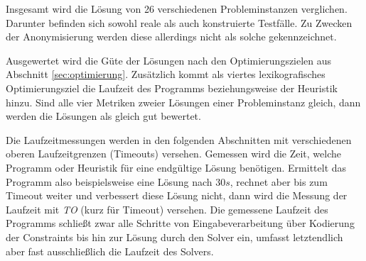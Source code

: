 Insgesamt wird die Lösung von 26 verschiedenen Probleminstanzen verglichen.
Darunter befinden sich sowohl reale als auch konstruierte Testfälle.
Zu Zwecken der Anonymisierung werden diese allerdings nicht als solche gekennzeichnet.

Ausgewertet wird die Güte der Lösungen nach den Optimierungszielen aus Abschnitt \ref{sec:optimierung}.
Zusätzlich kommt als viertes lexikografisches Optimierungsziel die Laufzeit des Programms beziehungsweise der Heuristik hinzu.
Sind alle vier Metriken zweier Lösungen einer Probleminstanz gleich, dann werden die Lösungen als gleich gut bewertet.

Die Laufzeitmessungen werden in den folgenden Abschnitten mit verschiedenen oberen Laufzeitgrenzen (Timeouts) versehen.
Gemessen wird die Zeit, welche Programm oder Heuristik für eine endgültige Lösung benötigen.
Ermittelt das Programm also beispielsweise eine Lösung nach $30s$, rechnet aber bis zum Timeout weiter und verbessert diese Lösung nicht,
dann wird die Messung der Laufzeit mit \textit{\gls{TO}} (kurz für Timeout) versehen.
Die gemessene Laufzeit des Programms schließt zwar alle Schritte von Eingabeverarbeitung über Kodierung der Constraints bis hin zur Lösung durch den Solver ein,
umfasst letztendlich aber fast ausschließlich die Laufzeit des Solvers.

